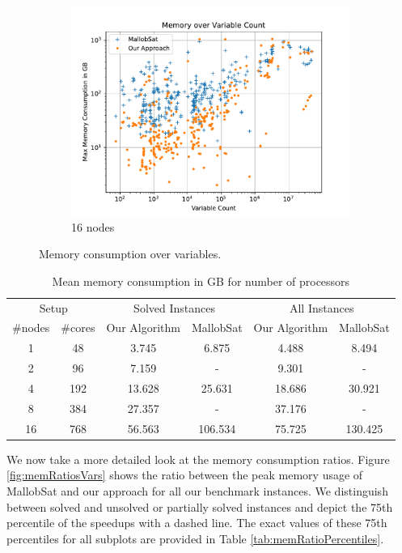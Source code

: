 \documentclass[12pt,a4paper,twoside]{scrartcl}
\numberwithin{equation}{section}
\begin{document}
\begin{figure}[!h]
\begin{subfigure}[c]{.45\textwidth}
    \includegraphics[scale=.45]{plots/16node_compare/mem_abs_over_vars.pdf}
    \caption{16 nodes}
  \end{subfigure}
  \caption{Memory consumption over variables.}
  \label{fig:memAbsVars}
\end{figure}

\begin{table}[!h]
  \center
  \begin{tabular}{ cccccc }
    \toprule
    \multicolumn{2}{c}{Setup} & \multicolumn{2}{c}{Solved Instances} & \multicolumn{2}{c}{All Instances}\\
    \#nodes & \#cores & Our Algorithm & MallobSat & Our Algorithm & MallobSat \\
    \midrule
    1  & 48  & 3.745  & 6.875   & 4.488   & 8.494\\
    2  & 96  & 7.159  & -       & 9.301   & -\\
    4  & 192 & 13.628 & 25.631  & 18.686  & 30.921\\
    8  & 384 & 27.357 & -       & 37.176  & -\\
    16 & 768 & 56.563 & 106.534 & 75.725 & 130.425\\
    \bottomrule
  \end{tabular}
  \caption{Mean memory consumption in GB for number of processors}
  \label{tab:memMean}
\end{table}

\label{sec:peakMemRatios}
We now take a more detailed look at the memory consumption ratios. Figure \ref{fig:memRatiosVars} shows the ratio between the peak memory usage of MallobSat and our approach for all our benchmark instances. We distinguish between solved and unsolved or partially solved instances and depict the 75th percentile of the speedups with a dashed line. The exact values of these 75th percentiles for all subplots are provided in Table \ref{tab:memRatioPercentiles}.
\end{document}

